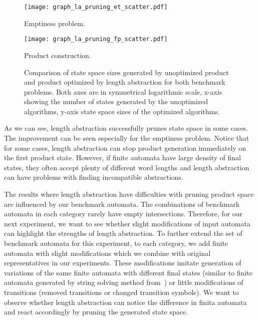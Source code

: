 \begin{figure*}[ht]
    \centering
    \begin{minipage}{0.49\linewidth}
        \centering
        \texttt{[image: graph\_la\_pruning\_et\_scatter.pdf]}
        \caption{Emptiness problem.}
        \label{fig:graph:et_pruning_state_space_sizes_comp}
    \end{minipage}
    \hfill
    \begin{minipage}{0.49\linewidth}
        \centering
        \texttt{[image: graph\_la\_pruning\_fp\_scatter.pdf]}
        \caption{Product construction.}
        \label{fig:graph:fp_pruning_state_space_sizes_comp}
    \end{minipage}
    \vspace{0.5cm}
    \caption{Comparison of state space sizes generated by unoptimized product and product optimized by length abstraction for both benchmark problems. Both axes are in symmetrical logarithmic scale\protect\footnotemark, x-axis showing the number of states generated by the unoptimized algorithms, y-axis state space sizes of the optimized algorithms.}
    \label{fig:graph:product_state_space_sizes}
\end{figure*}

As we can see, length abstraction successfully prunes state space in some cases. The improvement can be seen especially for the emptiness problem. Notice that for some cases, length abstraction can stop product generation immediately on the first product state. However, if finite automata have large density of final states, they often accept plenty of different word lengths and length abstraction can have problems with finding incompatible abstractions.

The results where length abstraction have difficulties with pruning product space are influenced by our benchmark automata. The combinations of benchmark automata in each category rarely have empty intersections. Therefore, for our next experiment, we want to see whether slight modifications of input automata can highlight the strengths of length abstraction. To further extend the set of benchmark automata for this experiment, to each category, we add finite automata with slight modifications which we combine with original representatives in our experiments. These modifications imitate generation of variations of the same finite automata with different final states (similar to finite automata generated by string solving method from~\cite{10.1007/978-3-319-08867-9_10}) or little modifications of transitions (removed transitions or changed transition symbols). We want to observe whether length abstraction can notice the difference in finita automata and react accordingly by pruning the generated state space.

